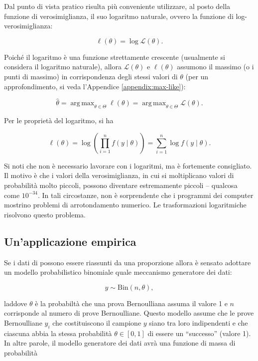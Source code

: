 \documentclass[
]{book}
\DeclareMathOperator{\argmax}{arg\,max}
\theoremstyle{definition}
\theoremstyle{definition}
\theoremstyle{definition}
\theoremstyle{definition}
\theoremstyle{remark}
\begin{document}
Dal punto di vista pratico risulta più conveniente utilizzare, al posto della funzione di verosimiglianza, il suo logaritmo naturale, ovvero la funzione di log-verosimiglianza:

\begin{equation}
\ell(\theta) = \log \mathcal{L}(\theta).
\end{equation}

Poiché il logaritmo è una funzione strettamente crescente (usualmente si considera il logaritmo naturale), allora \(\mathcal{L}(\theta)\) e \(\ell(\theta)\) assumono il massimo (o i punti di massimo) in corrispondenza degli stessi valori di \(\theta\) (per un approfondimento, si veda l'Appendice \ref{appendix:max-like}):

\[
\hat{\theta} = \argmax_{\theta \in \Theta} \ell(\theta) = \argmax_{\theta \in \Theta} \mathcal{L}(\theta).
\]

Per le proprietà del logaritmo, si ha

\begin{equation}
\ell(\theta) = \log \left( \prod_{i = 1}^n f(y \mid \theta) \right) = \sum_{i = 1}^n \log f(y \mid \theta).
\end{equation}

Si noti che non è necessario lavorare con i logaritmi, ma è fortemente consigliato. Il motivo è che i valori della verosimiglianza, in cui si moltiplicano valori di probabilità molto piccoli, possono diventare estremamente piccoli -- qualcosa come \(10^{-34}\). In tali circostanze, non è sorprendente che i programmi dei computer mostrino problemi di arrotondamento numerico. Le trasformazioni logaritmiche risolvono questo problema.

\hypertarget{unapplicazione-empirica-1}{%
\subsection{Un'applicazione empirica}\label{unapplicazione-empirica-1}}

Se i dati di \citet{zetschefuture2019} possono essere riassunti da una proporzione allora è sensato adottare un modello probabilistico binomiale quale meccanismo generatore dei dati:

\begin{equation}
y  \sim \mbox{Bin}(n, \theta),
\label{eq:binomialmodel}
\end{equation}

laddove \(\theta\) è la probabiltà che una prova Bernoulliana assuma il valore 1 e \(n\) corrisponde al numero di prove Bernoulliane. Questo modello assume che le prove Bernoulliane \(y_i\) che costituiscono il campione \(y\) siano tra loro indipendenti e che ciascuna abbia la stessa probabilità \(\theta \in [0, 1]\) di essere un ``successo'' (valore 1). In altre parole, il modello generatore dei dati avrà una funzione di massa di probabilità
\end{document}
